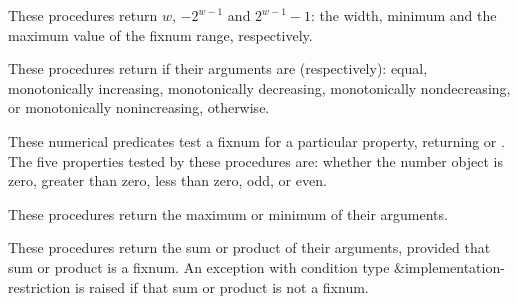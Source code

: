 \begin{entry}{%
}

These procedures return $w$,
$-2^{w-1}$ and $2^{w-1} - 1$: the
width, minimum and the maximum value of the fixnum range, respectively.
\end{entry}

\begin{entry}{%
}

These procedures return \schtrue{} if their arguments are (respectively):
equal, monotonically increasing, monotonically decreasing,
monotonically nondecreasing, or monotonically nonincreasing,
\schfalse{} otherwise.
\end{entry}

\begin{entry}{%
}

These numerical predicates test a fixnum for a particular property,
returning \schtrue{} or \schfalse{}.  The five properties tested by
these procedures are: whether the number object is zero, greater than zero,
less than zero, odd, or even.
\end{entry}

\begin{entry}{%
}

These procedures return the maximum or minimum of their arguments.
\end{entry}

\begin{entry}{%
}

These procedures return the sum or product of their arguments,
provided that sum or product is a fixnum.  An exception with condition
type {\cf\&implementation-restriction} is raised if
that sum or product is not a fixnum.
\end{entry}

